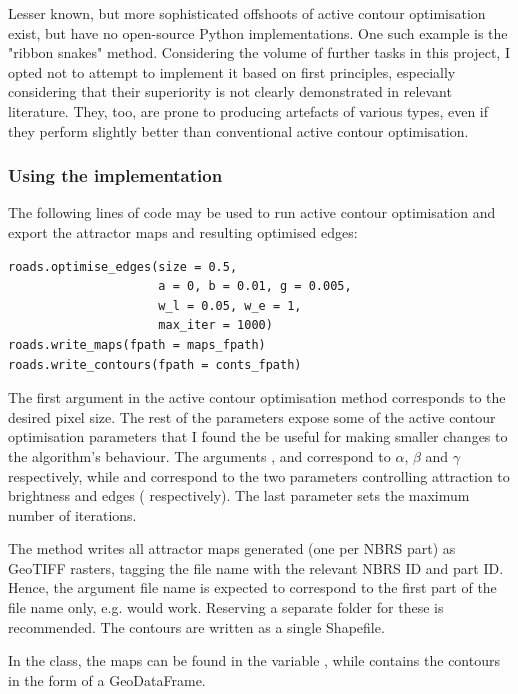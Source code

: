 Lesser known, but more sophisticated offshoots of active contour optimisation exist, but have no open-source Python implementations. One such example is the "ribbon snakes" method. Considering the volume of further tasks in this project, I opted not to attempt to implement it based on first principles, especially considering that their superiority is not clearly demonstrated in relevant literature. They, too, are prone to producing artefacts of various types, even if they perform slightly better than conventional active contour optimisation.

\subsubsection{Using the implementation}

The following lines of code may be used to run active contour optimisation and export the attractor maps and resulting optimised edges:

\begin{verbatim}
roads.optimise_edges(size = 0.5,
                     a = 0, b = 0.01, g = 0.005,
                     w_l = 0.05, w_e = 1,
                     max_iter = 1000)
roads.write_maps(fpath = maps_fpath)
roads.write_contours(fpath = conts_fpath)
\end{verbatim}

The first argument  in the active contour optimisation method corresponds to the desired pixel size. The rest of the parameters expose some of the active contour optimisation parameters that I found the be useful for making smaller changes to the algorithm's behaviour. The arguments ,  and  correspond to $\alpha$, $\beta$ and $\gamma$ respectively, while  and  correspond to the two parameters controlling attraction to brightness and edges (  respectively). The last parameter sets the maximum number of iterations.

The  method writes all attractor maps generated (one per NBRS part) as GeoTIFF rasters, tagging the file name with the relevant NBRS ID and part ID. Hence, the argument file name is expected to correspond to the first part of the file name only, e.g.  would work. Reserving a separate folder for these is recommended. The contours are written as a single Shapefile.

In the class, the maps can be found in the variable , while  contains the contours in the form of a GeoDataFrame.

